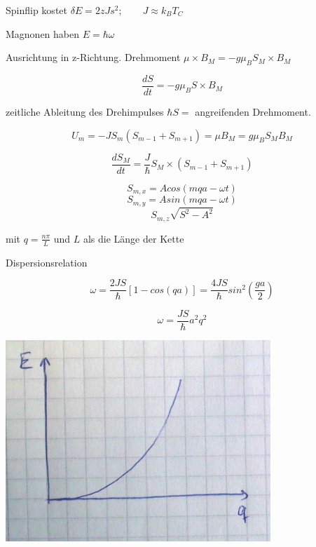 Spinflip kostet \(\delta E = 2zJs^2; \qquad J\approx k_BT_C\)

Magnonen haben \(E = \hbar\omega\)

Ausrichtung in z-Richtung. Drehmoment \(\mu\times B_M = - g\mu_B S_M\times B_M\)

\[\frac{dS}{dt} = -g\mu_B S\times B_M\]

zeitliche Ableitung des Drehimpulses \(\hbar S =\) angreifenden Drehmoment.

\[U_m = -J S_m(S_{m-1}+S_{m+1}) = \mu B_M = g\mu_BS_MB_M\]

\[\frac{dS_M}{dt}= \frac{J}{\hbar}S_M\times (S_{m-1}+S_{m+1})\]

\[S_{m,x} = Acos(mqa-\omega t)\]
\[S_{m,y} = Asin(mqa-\omega t)\]
\[S_{m,z}\sqrt{S^2-A^2}\]


mit \(q= \frac{n\pi}{L}\) und \(L\) als die Länge der Kette

Dispersionsrelation

\[\omega = \frac{2JS}{\hbar}[1-cos(qa)] =\frac{4JS}{\hbar} sin^2(\frac{ga}{2}) \]

\[\omega = \frac{JS}{\hbar}a^2q^2\]

\includegraphics[width=0.75\textwidth]{kap12_12.png}



